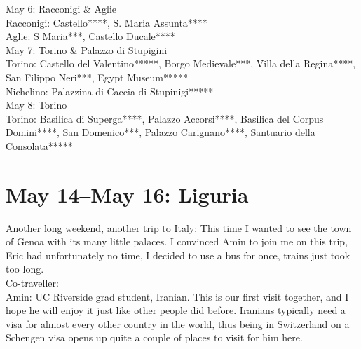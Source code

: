 May 6: Racconigi \& Aglie\\
Racconigi: Castello****, S. Maria Assunta****\\
Aglie: S Maria***, Castello Ducale****\\

May 7: Torino \& Palazzo di Stupigini\\
Torino: Castello del Valentino*****, Borgo Medievale***, Villa della Regina****, San Filippo Neri***, Egypt Museum*****\\
Nichelino: Palazzina di Caccia di Stupinigi*****\\

May 8: Torino\\
Torino: Basilica di Superga****, Palazzo Accorsi****, Basilica del Corpus Domini****, San Domenico***, Palazzo Carignano****, Santuario della Consolata*****

\section{May 14--May 16: Liguria}
\label{2016Liguria}

Another long weekend, another trip to Italy: This time I wanted to see the town of Genoa with its many little palaces. I convinced Amin to join me on this trip, Eric had unfortunately no time, I decided to use a bus for once, trains just took too long. \\

Co-traveller:\\
Amin: UC Riverside grad student, Iranian. This is our first visit together, and I hope he will enjoy it just like other people did before. Iranians typically need a visa for almost every other country in the world, thus being in Switzerland on a Schengen visa opens up quite a couple of places to visit for him here.\\

